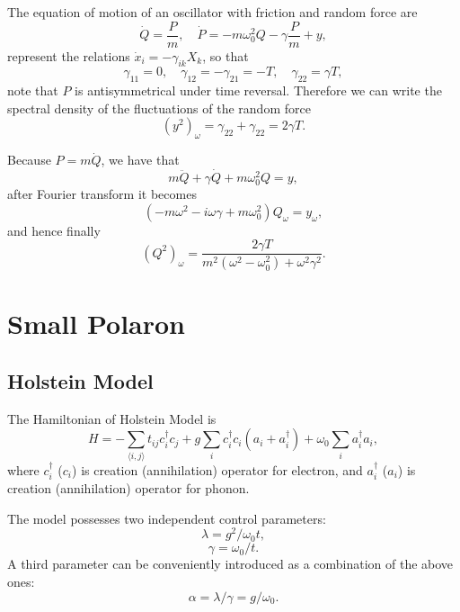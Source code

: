 \documentclass{book}
\numberwithin{equation}{section}
\begin{document}
The equation of motion of an oscillator with friction and random force are
\begin{equation}
  \dot{Q}=\frac{P}{m},\quad \dot{P}=-m\omega_0^2Q-\gamma\frac{P}{m}+y,
\end{equation}
represent the relations $\dot{x}_i=-\gamma_{ik}X_k$, so that
\begin{equation}
  \gamma_{11}=0,\quad \gamma_{12}=-\gamma_{21}=-T,\quad\gamma_{22}=\gamma T,
\end{equation}
note that $P$ is antisymmetrical under time reversal.  Therefore we
can write the spectral density of the fluctuations of the random force
\begin{equation}
  (y^2)_\omega=\gamma_{22}+\gamma_{22}=2\gamma T.
\end{equation}

Because $P=m\dot{Q}$, we have that
\begin{equation}
  m\ddot{Q}+\gamma\dot{Q}+m\omega_0^2Q=y,
\end{equation}
after Fourier transform it becomes
\begin{equation}
  (-m\omega^2-i\omega\gamma+m\omega_0^2)Q_\omega=y_\omega,
\end{equation}
and hence finally 
\begin{equation}
  (Q^2)_\omega=\frac{2\gamma T}{m^2(\omega^2-\omega_0^2)+\omega^2\gamma^2}.
\end{equation}

\chapter{Small Polaron}
\section{Holstein Model}
The Hamiltonian of Holstein Model is
\begin{equation}
  H=-\sum_{\langle{i,j}\rangle}t_{ij}c_i^\dag c_j+g\sum_ic_i^\dag c_i(a_i+a_i^\dag)
  +\omega_0\sum_ia_i^\dag a_i,
  \label{Holstein}
\end{equation}
where $c_i^\dag$ ($c_i$) is creation (annihilation) operator for electron, and
$a_i^\dag$ ($a_i$) is creation (annihilation) operator for phonon.

The model possesses two independent control parameters:
\begin{equation}
  \lambda =g^2/\omega_0t,
\end{equation}
\begin{equation}
  \gamma=\omega_0/t.
\end{equation}
A third parameter can be conveniently introduced as a combination of
the above ones:
\begin{equation}
  \alpha=\lambda/\gamma=g/\omega_0.
\end{equation}
\end{document}
